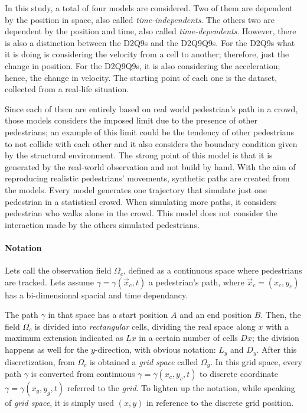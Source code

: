 \documentclass[class=article, crop=false]{standalone}
\begin{document}
In this study, a total of four models are considered. 
Two of them are dependent by the position in space, also called \emph{time-independents}. 
The others two are dependent by the position and time, also called \emph{time-dependents}.
However, there is also a distinction between the D2Q9s and the D2Q9Q9s. 
For the D2Q9s what it is doing is considering the velocity from a cell to another; therefore, just the change in position. 
For the D2Q9Q9s, it is also considering the acceleration; hence, the change in velocity. 
The starting point of each one is the dataset, collected from a real-life situation.

Since each of them are entirely based on real world pedestrian’s path in a crowd, those models considers the imposed limit due to the presence of other pedestrians;
an example of this limit could be the tendency of other pedestrians to not collide with each other and it also considers the boundary condition given by the structural environment. 
The strong point of this model is that it is generated by the real-world observation and not build by hand. 
With the aim of reproducing realistic pedestrians’ movements, synthetic paths are created from the models. 
Every model generates one trajectory that simulate just one pedestrian in a statistical crowd. 
When simulating more paths, it considers pedestrian who walks alone in the crowd. 
This model does not consider the interaction made by the others simulated pedestrians.


\paragraph{Notation}
Lets call the observation field $\Omega_c$, defined as a continuous space where pedestrians are tracked.
Lets assume $\gamma=\gamma( \vec x_c, t)$ a pedestrian's path, where $\vec x_c = (x_c, y_c)$ has a bi-dimensional spacial and time dependancy.

The path $\gamma$ in that space has a start position $A$ and an end position $B$. 
Then, the field $\Omega_c$ is divided into \emph{rectangular} cells, dividing the real space along $x$ with a maximum extension indicated as $Lx$ in a certain number of cells $Dx$; 
the division happens as well for the $y$-direction, with obvious notation: $L_y$ and $D_y$.
After this discretization, from $\Omega_c$ is obtained a \emph{grid space} called $\Omega_g$. 
In this grid space, every path $\gamma$ is converted from continuous $\gamma=\gamma(x_c, y_c, t)$ to discrete coordinate  $\gamma=\gamma(x_g, y_g, t)$ referred to the \emph{grid}. 
To lighten up the notation, while speaking of \emph{grid space}, it is simply used $(x, y)$ in reference to the discrete grid position.
\end{document}
